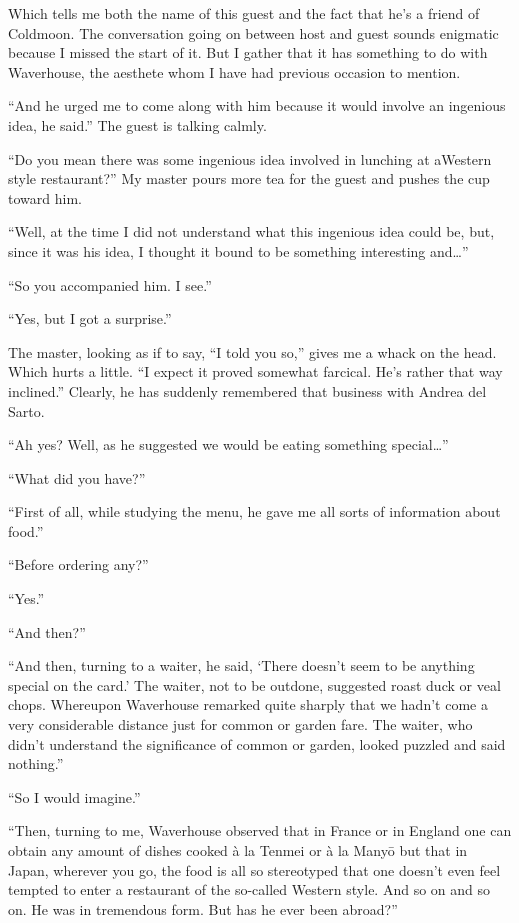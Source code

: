 \documentclass[12pt, openright]{book}
\begin{document}
Which tells me both the name of this guest and the fact that he's a
friend of Coldmoon. The conversation going on between host and guest
sounds enigmatic because I missed the start of it. But I gather that it
has something to do with Waverhouse, the aesthete whom I have had
previous occasion to mention.

``And he urged me to come along with him because it would involve an
ingenious idea, he said.'' The guest is talking calmly.

``Do you mean there was some ingenious idea involved in lunching at
aWestern style restaurant?'' My master pours more tea for the guest and
pushes the cup toward him.

``Well, at the time I did not understand what this ingenious idea could
be, but, since it was his idea, I thought it bound to be something
interesting and\ldots{}''

``So you accompanied him. I see.''

``Yes, but I got a surprise.''

The master, looking as if to say, ``I told you so,'' gives me a whack on
the head. Which hurts a little. ``I expect it proved somewhat farcical.
He's rather that way inclined.'' Clearly, he has suddenly remembered
that business with Andrea del Sarto.

``Ah yes? Well, as he suggested we would be eating something
special\ldots{}''

``What did you have?''

``First of all, while studying the menu, he gave me all sorts of
information about food.''

``Before ordering any?''

``Yes.''

``And then?''

``And then, turning to a waiter, he said, `There doesn't seem to be
anything special on the card.' The waiter, not to be outdone, suggested
roast duck or veal chops. Whereupon Waverhouse remarked quite sharply
that we hadn't come a very considerable distance just for common or
garden fare. The waiter, who didn't understand the significance of
common or garden, looked puzzled and said nothing.''

``So I would imagine.''

``Then, turning to me, Waverhouse observed that in France or in England
one can obtain any amount of dishes cooked à la Tenmei or à la Manyō but
that in Japan, wherever you go, the food is all so stereotyped that one
doesn't even feel tempted to enter a restaurant of the so-called Western
style. And so on and so on. He was in tremendous form. But has he ever
been abroad?''
\end{document}
